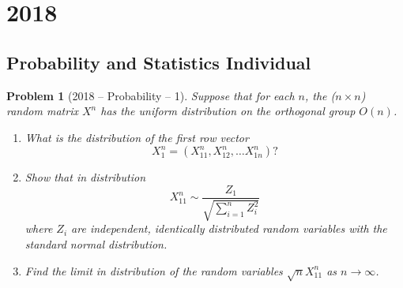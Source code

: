 \documentclass[12pt]{amsart}
\newtheorem{problem}{Problem}
\begin{document}
\section*{2018}
\subsection*{Probability and Statistics Individual}

\begin{problem}[2018 -- Probability -- 1]
Suppose that for each $n$, the ($n \times n$) random matrix $X^n$ has the uniform distribution on the orthogonal group $O(n)$.
\begin{enumerate}[label=(\alph*)]
\item What is the distribution of the first row vector
$$
X_1^n=(X_{11}^n, X_{12}^n, \ldots X_{1 n}^n)?
$$
\item Show that in distribution
$$
X_{11}^n \sim \frac{Z_1}{\sqrt{\sum_{i=1}^n Z_i^2}}
$$
where $Z_i$ are independent, identically distributed random variables with the standard normal distribution.
\item Find the limit in distribution of the random variables $\sqrt{n} X_{11}^n$ as $n \rightarrow \infty$.
\end{enumerate}
\end{problem}
\end{document}
